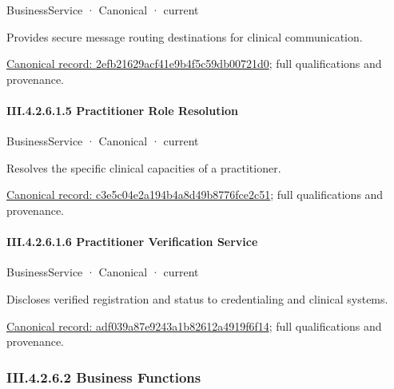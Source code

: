 \label{element:2efb21629acf41e9b4f5c59db00721d0}
{\small BusinessService · Canonical · current}\par

Provides secure message routing destinations for clinical communication.


{\footnotesize \href{../../../../continuum/business/business-service/2efb21629acf41e9b4f5c59db00721d0.md}{Canonical record: 2efb21629acf41e9b4f5c59db00721d0}; full qualifications and provenance.}\par
\paragraph*{III.4.2.6.1.5 Practitioner Role Resolution}
\label{navigation:III.4.2.6.1.5}

\label{element:c3e5c04e2a194b4a8d49b8776fce2c51}
{\small BusinessService · Canonical · current}\par

Resolves the specific clinical capacities of a practitioner.


{\footnotesize \href{../../../../continuum/business/business-service/c3e5c04e2a194b4a8d49b8776fce2c51.md}{Canonical record: c3e5c04e2a194b4a8d49b8776fce2c51}; full qualifications and provenance.}\par
\paragraph*{III.4.2.6.1.6 Practitioner Verification Service}
\label{navigation:III.4.2.6.1.6}

\label{element:adf039a87e9243a1b82612a4919f6f14}
{\small BusinessService · Canonical · current}\par

Discloses verified registration and status to credentialing and clinical systems.


{\footnotesize \href{../../../../continuum/business/business-service/adf039a87e9243a1b82612a4919f6f14.md}{Canonical record: adf039a87e9243a1b82612a4919f6f14}; full qualifications and provenance.}\par
\subsubsection*{III.4.2.6.2 Business Functions}
\label{navigation:III.4.2.6.2}

